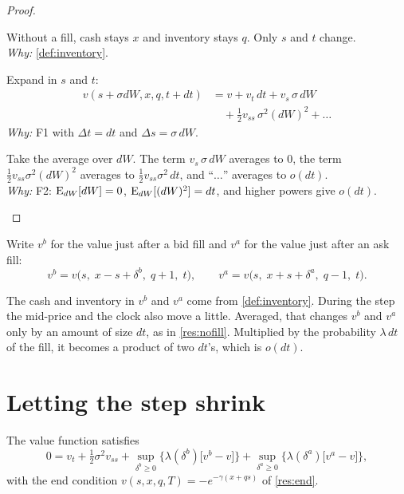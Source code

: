 \begin{proof}
\begin{steps}
  \item Without a fill, cash stays $x$ and inventory stays $q$. Only $s$ and $t$ change.
  \\ \emph{Why:} \cref{def:inventory}.
  \item Expand in $s$ and $t$:
  \[
    \begin{aligned}
      v(s+\sigma dW,x,q,t+dt)&=v+v_t\,dt+v_s\,\sigma\,dW\\
      &\quad+\tfrac12v_{ss}\,\sigma^2(dW)^2+\dots
    \end{aligned}
  \]
  \emph{Why:} F1 with $\Delta t=dt$ and $\Delta s=\sigma\,dW$.
  \item Take the average over $dW$. The term $v_s\,\sigma\,dW$ averages to $0$, the term $\tfrac12v_{ss}\sigma^2(dW)^2$ averages to $\tfrac12v_{ss}\sigma^2\,dt$, and ``$\dots$'' averages to $o(dt)$.
  \\ \emph{Why:} F2: $\operatorname{E}_{dW}[dW]=0$, $\operatorname{E}_{dW}[(dW)^2]=dt$, and higher powers give $o(dt)$.
\end{steps}
\end{proof}

\begin{definition}
\label{def:jumps}
Write $v^b$ for the value just after a bid fill and $v^a$ for the value just after an ask fill:
\[
  v^b=v\big(s,\;x-s+\delta^b,\;q+1,\;t\big),\qquad
  v^a=v\big(s,\;x+s+\delta^a,\;q-1,\;t\big).
\]
\end{definition}

The cash and inventory in $v^b$ and $v^a$ come from \cref{def:inventory}. During the step the mid-price and the clock also move a little. Averaged, that changes $v^b$ and $v^a$ only by an amount of size $dt$, as in \cref{res:nofill}. Multiplied by the probability $\lambda\,dt$ of the fill, it becomes a product of two $dt$'s, which is $o(dt)$.

\section{Letting the step shrink}

\begin{result}
\label{res:hjb}
The value function satisfies
\[
  0=v_t+\tfrac12\sigma^2v_{ss}
  +\sup_{\delta^b\ge0}\Big\{\lambda(\delta^b)\big[v^b-v\big]\Big\}
  +\sup_{\delta^a\ge0}\Big\{\lambda(\delta^a)\big[v^a-v\big]\Big\},
\]
with the end condition $v(s,x,q,T)=-e^{-\gamma(x+qs)}$ of \cref{res:end}.
\end{result}

